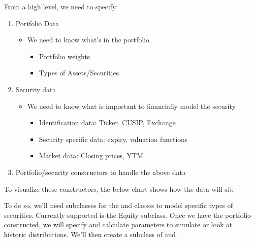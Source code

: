 \documentclass[letterpaper,10pt,english]{sphinxmanual}
\begin{document}
\sphinxAtStartPar
From a high level, we need to specify:
\begin{enumerate}
%
\item {} 
\sphinxAtStartPar
Portfolio Data
\begin{itemize}
\item {} 
\sphinxAtStartPar
We need to know what’s in the portfolio
\begin{itemize}
\item {} 
\sphinxAtStartPar
Portfolio weights

\item {} 
\sphinxAtStartPar
Types of Assets/Securities

\end{itemize}

\end{itemize}

\item {} 
\sphinxAtStartPar
Security data
\begin{itemize}
\item {} 
\sphinxAtStartPar
We need to know what is important to financially model the
security
\begin{itemize}
\item {} 
\sphinxAtStartPar
Identification data: Ticker, CUSIP, Exchange

\item {} 
\sphinxAtStartPar
Security specific data: expiry, valuation functions

\item {} 
\sphinxAtStartPar
Market data: Closing prices, YTM

\end{itemize}

\end{itemize}

\item {} 
\sphinxAtStartPar
Portfolio/security constructors to handle the above data

\end{enumerate}

\sphinxAtStartPar
To visualize these constructors, the below chart shows how the data will
sit:

\sphinxAtStartPar
{}

\sphinxAtStartPar
To do so, we’ll need subclasses for the  and
 classes to model specific types of securities. Currently
supported is the Equity subclass. Once we have the portfolio
constructed, we will specify and calculate parameters to simulate or
look at historic distributions. We’ll then create a subclass of
 and .
\end{document}
